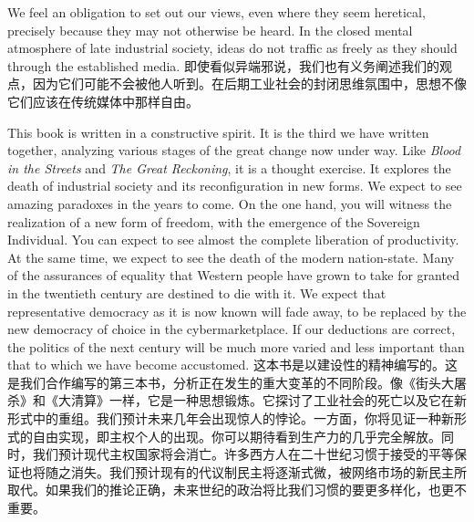 \begin{Parallel}{97mm}{45mm}
  \ParallelLText
  {We feel an obligation to set out our views, even where they seem heretical, precisely because they may not otherwise be heard. In the closed mental atmosphere of late industrial society, ideas do not traffic as freely as they should through the established media.}  
  \ParallelRText
  {\small 即使看似异端邪说，我们也有义务阐述我们的观点，因为它们可能不会被他人听到。在后期工业社会的封闭思维氛围中，思想不像它们应该在传统媒体中那样自由。}
  \ParallelPar


  \ParallelLText
  { This book is written in a constructive spirit. It is the third we have written together, analyzing various stages of the great change now under way. Like \emph{Blood in the Streets} and \emph{The Great Reckoning}, it is a thought exercise. It explores the death of industrial society and its reconfiguration in new forms. We expect to see amazing paradoxes in the years to come. On the one hand, you will witness the realization of a new form of freedom, with the emergence of the Sovereign Individual. You can expect to see almost the complete liberation of productivity. At the same time, we expect to see the death of the modern nation-state. Many of the assurances of equality that Western people have grown to take for granted in the twentieth century are destined to die with it. We expect that representative democracy as it is now known will fade away, to be replaced by the new democracy of choice in the cybermarketplace. If our deductions are correct, the politics of the next century will be much more varied and less important than that to which we have become accustomed. }  
  \ParallelRText
  {\small 这本书是以建设性的精神编写的。这是我们合作编写的第三本书，分析正在发生的重大变革的不同阶段。像《街头大屠杀》和《大清算》一样，它是一种思想锻炼。它探讨了工业社会的死亡以及它在新形式中的重组。我们预计未来几年会出现惊人的悖论。一方面，你将见证一种新形式的自由实现，即主权个人的出现。你可以期待看到生产力的几乎完全解放。同时，我们预计现代主权国家将会消亡。许多西方人在二十世纪习惯于接受的平等保证也将随之消失。我们预计现有的代议制民主将逐渐式微，被网络市场的新民主所取代。如果我们的推论正确，未来世纪的政治将比我们习惯的要更多样化，也更不重要。}
  \ParallelPar



\end{Parallel}
